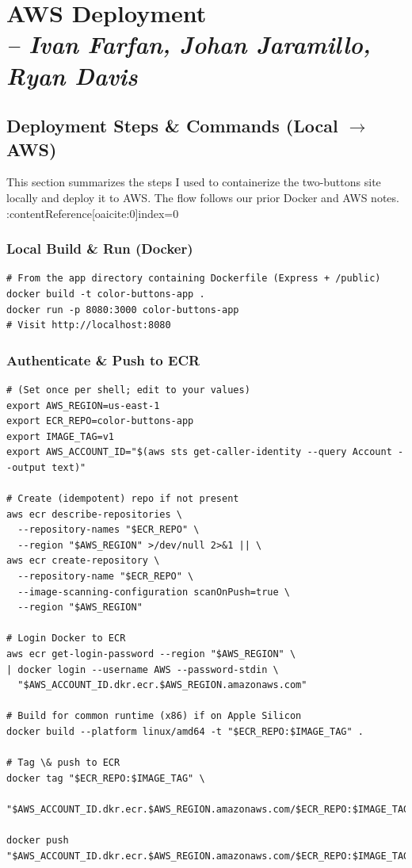 \chapter{AWS Deployment \\
\small{\textit{-- Ivan Farfan, Johan Jaramillo, Ryan Davis}}}
\label{Chapter::AWSDeployment}

\section{Deployment Steps \& Commands (Local \texorpdfstring{$\rightarrow$}{->} AWS)}
This section summarizes the steps I used to containerize the two-buttons site locally and deploy it to AWS.
The flow follows our prior Docker and AWS notes. :contentReference[oaicite:0]{index=0}

\subsection{Local Build \& Run (Docker)}
\begin{verbatim}
# From the app directory containing Dockerfile (Express + /public)
docker build -t color-buttons-app .
docker run -p 8080:3000 color-buttons-app
# Visit http://localhost:8080
\end{verbatim}

\subsection{Authenticate \& Push to ECR}
\begin{verbatim}
# (Set once per shell; edit to your values)
export AWS_REGION=us-east-1
export ECR_REPO=color-buttons-app
export IMAGE_TAG=v1
export AWS_ACCOUNT_ID="$(aws sts get-caller-identity --query Account --output text)"

# Create (idempotent) repo if not present
aws ecr describe-repositories \
  --repository-names "$ECR_REPO" \
  --region "$AWS_REGION" >/dev/null 2>&1 || \
aws ecr create-repository \
  --repository-name "$ECR_REPO" \
  --image-scanning-configuration scanOnPush=true \
  --region "$AWS_REGION"

# Login Docker to ECR
aws ecr get-login-password --region "$AWS_REGION" \
| docker login --username AWS --password-stdin \
  "$AWS_ACCOUNT_ID.dkr.ecr.$AWS_REGION.amazonaws.com"

# Build for common runtime (x86) if on Apple Silicon
docker build --platform linux/amd64 -t "$ECR_REPO:$IMAGE_TAG" .

# Tag \& push to ECR
docker tag "$ECR_REPO:$IMAGE_TAG" \
  "$AWS_ACCOUNT_ID.dkr.ecr.$AWS_REGION.amazonaws.com/$ECR_REPO:$IMAGE_TAG"

docker push "$AWS_ACCOUNT_ID.dkr.ecr.$AWS_REGION.amazonaws.com/$ECR_REPO:$IMAGE_TAG"
\end{verbatim}

